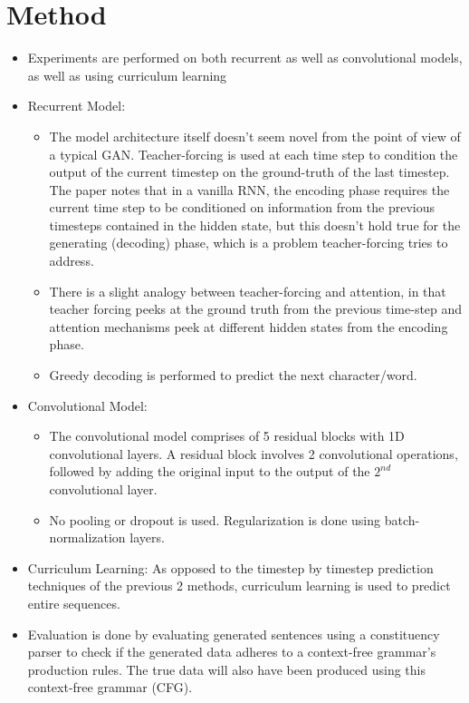 \documentclass[12pt]{scrartcl}
\begin{document}
\section{Method}
  \begin{itemize}
    \item Experiments are performed on both recurrent as well as convolutional models, as well as using curriculum learning
    \item Recurrent Model:
      \begin{itemize}
        \item The model architecture itself doesn't seem novel from the point of view of a typical GAN. Teacher-forcing is used at each time step to condition the output of the current timestep on the ground-truth of the last timestep. The paper notes that in a vanilla RNN, the encoding phase requires the current time step to be conditioned on information from the previous timesteps contained in the hidden state, but this doesn't hold true for the generating (decoding) phase, which is a problem teacher-forcing tries to address.
        \item There is a slight analogy between teacher-forcing and attention, in that teacher forcing peeks at the ground truth from the previous time-step and attention mechanisms peek at different hidden states from the encoding phase.
        \item Greedy decoding is performed to predict the next character/word.
      \end{itemize}
    \item Convolutional Model:
      \begin{itemize}
        \item The convolutional model comprises of 5 residual blocks with 1D convolutional layers. A residual block involves 2 convolutional operations, followed by adding the original input to the output of the $2^{nd}$ convolutional layer.
        \item No pooling or dropout is used. Regularization is done using batch-normalization layers.
      \end{itemize}
    \item Curriculum Learning: As opposed to the timestep by timestep prediction techniques of the previous 2 methods, curriculum learning is used to predict entire sequences. \cite{bengio2009curriculum}
    \item Evaluation is done by evaluating generated sentences using a constituency parser to check if the generated data adheres to a context-free grammar's production rules. The true data will also have been produced using this context-free grammar (CFG).

\end{itemize}
\end{document}
